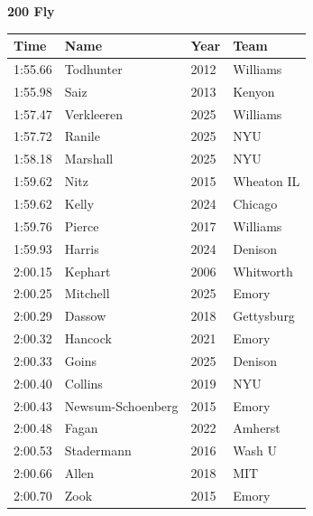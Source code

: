 \noindent\begin{minipage}[t]{0.98\textwidth}
\centering
\textbf{\textcolor{teamprimary}{200 Fly}}\par
\vspace{0.5em}
\centering
\small
\renewcommand{\arraystretch}{1.0}
\setlength{\tabcolsep}{4pt}
\begin{tabular}{@{}p{2.5cm}p{4.5cm}p{1.5cm}p{2.5cm}@{}}
\toprule
\textbf{Time} & \textbf{Name} & \textbf{Year} & \textbf{Team} \\
\midrule
1:55.66 & Todhunter & 2012 & Williams \\
1:55.98 & Saiz & 2013 & Kenyon \\
1:57.47 & Verkleeren & 2025 & Williams \\
1:57.72 & Ranile & 2025 & NYU \\
1:58.18 & Marshall & 2025 & NYU \\
1:59.62 & Nitz & 2015 & Wheaton IL \\
1:59.62 & Kelly & 2024 & Chicago \\
1:59.76 & Pierce & 2017 & Williams \\
1:59.93 & Harris & 2024 & Denison \\
2:00.15 & Kephart & 2006 & Whitworth \\
2:00.25 & Mitchell & 2025 & Emory \\
2:00.29 & Dassow & 2018 & Gettysburg \\
2:00.32 & Hancock & 2021 & Emory \\
2:00.33 & Goins & 2025 & Denison \\
2:00.40 & Collins & 2019 & NYU \\
2:00.43 & Newsum-Schoenberg & 2015 & Emory \\
2:00.48 & Fagan & 2022 & Amherst \\
2:00.53 & Stadermann & 2016 & Wash U \\
2:00.66 & Allen & 2018 & MIT \\
2:00.70 & Zook & 2015 & Emory \\
\bottomrule
\end{tabular}
\end{minipage}
\vspace{1.2em}

